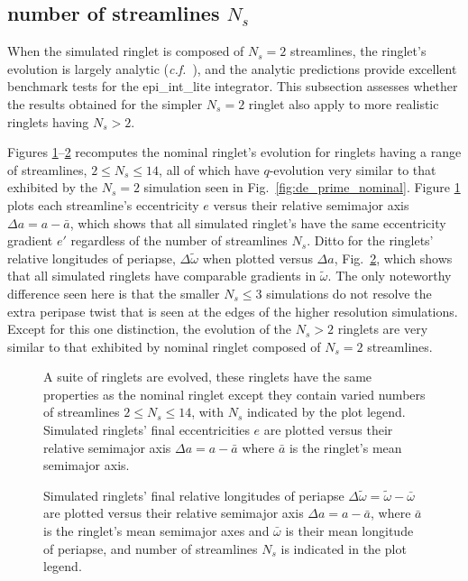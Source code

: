 \documentclass[preprint]{aastex62}
\begin{document}
\subsection{number of streamlines $N_s$}
\label{subsec:num_streamlines}

When the simulated ringlet is composed of $N_s=2$ streamlines, the ringlet's
evolution is largely analytic ({\it c.f.}\ \citealt{BGT82, BGT83}), and the analytic
predictions provide excellent benchmark tests for the epi\_int\_lite integrator. This subsection 
assesses whether the results obtained for the simpler $N_s=2$ ringlet also apply to
more realistic ringlets having $N_s>2$.

Figures \ref{fig:e_vs_da_streamlines}--\ref{fig:delta_wt_vs_da_streamlines} recomputes the nominal
ringlet's evolution for ringlets having a range of streamlines, $2\le N_s\le14$, all of which
have $q$-evolution very similar to that exhibited by the $N_s=2$ simulation seen in 
Fig.\ \ref{fig:de_prime_nominal}.  Figure \ref{fig:e_vs_da_streamlines} 
plots each streamline's eccentricity $e$
versus their relative semimajor axis $\Delta a=a-\bar{a}$, which shows that
all simulated ringlet's have the same eccentricity gradient $e'$ regardless
of the number of streamlines $N_s$.
Ditto for the ringlets' relative longitudes of periapse, $\Delta\tilde{\omega}$ when
plotted versus $\Delta a$, Fig.\ \ref{fig:delta_wt_vs_da_streamlines},
which shows that all simulated ringlets have comparable gradients in $\tilde{\omega}$.
The only noteworthy difference seen here is that the smaller $N_s\le 3$ simulations
do not resolve the extra peripase twist that is seen at the edges of the higher resolution simulations.
Except for this one distinction,
the evolution of the $N_s>2$ ringlets are very similar to that exhibited by nominal
ringlet composed of $N_s=2$ streamlines.

\begin{figure}
    \caption{
        \label{fig:e_vs_da_streamlines}
        A suite of ringlets are evolved, these ringlets have the same properties as the
        nominal ringlet except they contain varied numbers of streamlines $2\le N_s\le14$,
        with $N_s$ indicated by the plot legend.
        Simulated ringlets' final eccentricities $e$ are plotted versus their relative
        semimajor axis $\Delta a=a-\bar{a}$ where $\bar{a}$ is the ringlet's mean semimajor axis. 
    }
\end{figure}
\begin{figure}
    \caption{
        \label{fig:delta_wt_vs_da_streamlines}
        Simulated ringlets' final relative longitudes of periapse 
        $\Delta\tilde{\omega} = \tilde{\omega} - \bar{\omega}$ are plotted versus their relative
        semimajor axis $\Delta a=a-\bar{a}$, where $\bar{a}$ is the ringlet's mean semimajor axes 
        and $\bar{\omega}$ is their mean longitude of periapse, and number of streamlines $N_s$
        is indicated in the plot legend. 
    }
\end{figure}
\end{document}
